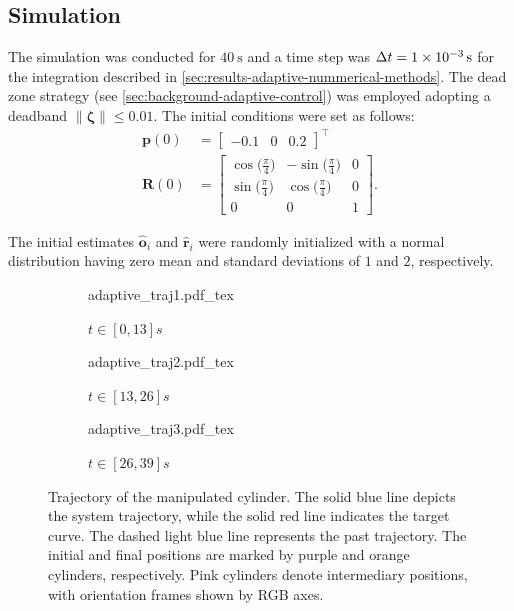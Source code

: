 \subsection{Simulation}
The simulation was conducted for $\qty{40}{\second}$ and a time step was $\Delta t=\qty{1E-3}{\second}$ for the integration described in \cref{sec:results-adaptive-nummerical-methods}. The dead zone strategy (see \cref{sec:background-adaptive-control}) was employed adopting a deadband $\|\boldsymbol{\zeta}\| \le 0.01$. The initial conditions were set as follows:
\begin{align}
    \mathbf{p}(0) &= \begin{bmatrix}
        -0.1 & 0 & 0.2
    \end{bmatrix}^\top\\
    \mathbf{R}(0) &= \begin{bmatrix}
        \cos\bigl(\frac{\pi}{4}\bigr) & -\sin\bigl(\frac{\pi}{4}\bigr) & 0\\
        \sin\bigl(\frac{\pi}{4}\bigr) & \cos\bigl(\frac{\pi}{4}\bigr) & 0\\
        0 & 0 & 1
    \end{bmatrix}.
\end{align}

The initial estimates $\widehat{\mathbf{o}}_i$ and $\widehat{\mathbf{r}}_i$ were randomly initialized with a normal distribution having zero mean and standard deviations of $1$ and $2$, respectively. 
\begin{figure}[ht]
    \centering
    \begin{subfigure}[b]{0.32\textwidth}
        \centering
        \def\svgwidth{\linewidth}
        {{adaptive_traj1.pdf_tex}}
        \caption{$t\in[0, 13]s$}
        \label{fig:adaptive-traj-first}
    \end{subfigure}
    \hfill
    \begin{subfigure}[b]{0.32\textwidth}
        \centering
        \def\svgwidth{\linewidth}
        {{adaptive_traj2.pdf_tex}}
        \caption{$t\in[13, 26]s$}
        \label{fig:adaptive-traj-second}
    \end{subfigure}
    \hfill
    \begin{subfigure}[b]{0.32\textwidth}
        \centering
        \def\svgwidth{\linewidth}
        {{adaptive_traj3.pdf_tex}}
        \caption{$t\in[26, 39]s$}
        \label{fig:adaptive-traj-third}
    \end{subfigure}
    \caption{Trajectory of the manipulated cylinder. The solid blue line depicts the system trajectory, while the solid red line indicates the target curve. The dashed light blue line represents the past trajectory. The initial and final positions are marked by purple and orange cylinders, respectively. Pink cylinders denote intermediary positions, with orientation frames shown by RGB axes.}
    \label{fig:adaptive-trajectory}
\end{figure}

